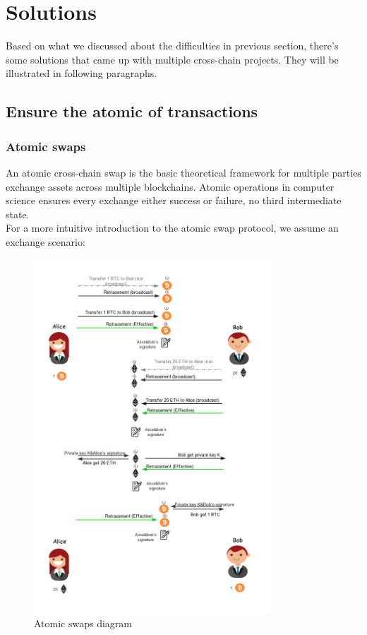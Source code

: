 \section{Solutions}

\noindent Based on what we discussed about the difficulties in previous section, there's some solutions that came up with multiple cross-chain projects. They will be illustrated in following paragraphs.
\subsection{Ensure the atomic of transactions}
\subsubsection{Atomic swaps}
\noindent An atomic cross-chain swap\cite{herlihy2018atomic} is the basic theoretical framework for multiple parties exchange assets across multiple blockchains. Atomic operations in computer science ensures every exchange either success or failure, no third intermediate state.\\
\noindent For a more intuitive introduction to the atomic swap protocol, we assume an exchange scenario:
   \begin{figure}[H]
    \includegraphics[width=0.79\textwidth]{./figures/atomic_swaps.png}
    \centering
    \caption{Atomic swaps diagram}%
    \centering
    \label{fig:atomic}
    \end{figure}
